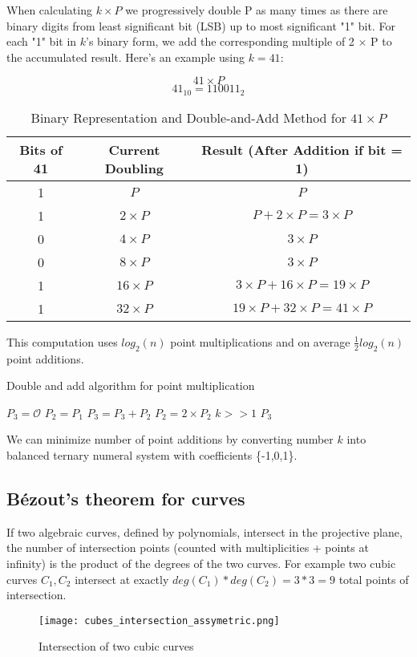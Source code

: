 \documentclass[bp,en]{FEIstyle}
\begin{document}
When calculating $k\times P$ we progressively double P as many times as there are binary digits from least significant bit (LSB) up to most significant "1" bit. For each "1" bit in $k$'s binary form, we add the corresponding multiple of 2 $\times$ P to the accumulated result. Here's an example using $k=41$:

\[
41 \times P 
\]
\[
41_{10} = 110011_2  
\]
\begin{table}[H]
\centering
\begin{tabular}{|c|c|c|}
\hline
\textbf{Bits of 41} & \textbf{Current Doubling} & \textbf{Result (After Addition if bit = 1)} \\ \hline
1 & $P$ & $P$ \\ \hline
1 & $2\times P$ & $P+2\times P=3\times P$ \\ \hline
0 & $4\times P$ & $3\times P$ \\ \hline
0 & $8\times P$ & $3\times P$ \\ \hline
1 & $16\times P$ & $3\times P+16\times P=19\times P$ \\ \hline
1 & $32\times P$ & $19\times P+32\times P=41\times P$ \\ \hline
\end{tabular}
\caption{Binary Representation and Double-and-Add Method for $41 \times P$}\end{table}This computation uses $log_2(n)$ point multiplications and on average $\frac{1}{2}log_2(n)$ point additions. 
\newpage

\begin{algorithm}
\caption{Double and add algorithm for point multiplication }  
\label{alg:double-and-add-safer}                         
\begin{algorithmic}[1]                    
    \STATE $P_3 = \mathcal{O}$
    \STATE $P_2 = P_1$ 
            \STATE $P_3= P_3 + P_2$ 
        \ENDIF
        \STATE $P_2 = 2 \times P_2$ 
        \STATE $k >> 1$
    \ENDWHILE
    \RETURN $P_3$
\end{algorithmic}
\end{algorithm}
We can minimize number of point additions by converting number $k$ into balanced ternary numeral system with coefficients \{-1,0,1\}. 

\subsection*{Bézout's theorem for curves }
If two algebraic curves, defined by polynomials, intersect in the projective plane, the number of intersection points (counted with multiplicities + points at infinity) is the product of the degrees of the two curves. For example two cubic curves  $C_1,C_2$ intersect at exactly $deg(C_1)*deg(C_2)=3*3=9$ total points of intersection. 
\begin{figure}[h!]
  \centering
\texttt{[image: cubes\_intersection\_assymetric.png]}
  \caption{Intersection of two cubic curves}
  \label{fig:your_label}
\end{figure}
\end{document}
